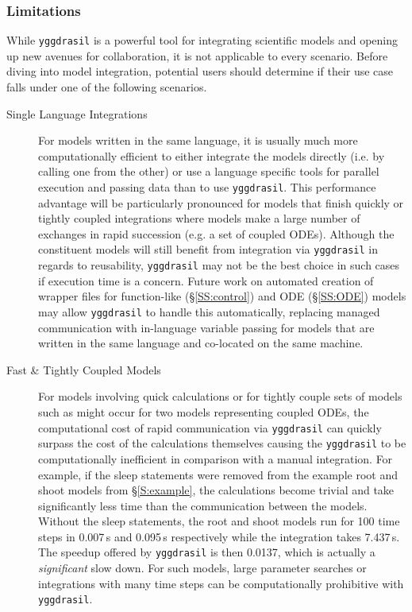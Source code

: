 \documentclass[journal]{IEEEtran}
\newcommand{\pkg}{{\tt yggdrasil}{}}
\begin{document}
\subsubsection{Limitations}\label{SS:limitations}
%
While {\pkg} is a powerful tool for integrating scientific models and opening up new avenues for collaboration, it is not applicable to every scenario. Before diving into model integration, potential users should determine if their use case falls under one of the following scenarios.
%
\begin{description}
	\item[Single Language Integrations] For models written in the same language, it is usually much more computationally efficient to either integrate the models directly (i.e. by calling one from the other) or use a language specific tools for parallel execution and passing data \citep[e.g. Parsl in Python][]{babuji18} than to use {\pkg}. This performance advantage will be particularly pronounced for models that finish quickly or tightly coupled integrations where models make a large number of exchanges in rapid succession (e.g. a set of coupled ODEs). Although the constituent models will still benefit from integration via {\pkg} in regards to reusability, {\pkg} may not be the best choice in such cases if execution time is a concern. Future work on automated creation of wrapper files for function-like (\S\ref{SS:control}) and ODE (\S\ref{SS:ODE}) models may allow {\pkg} to handle this automatically, replacing managed communication with in-language variable passing for models that are written in the same language and co-located on the same machine.
	\item[Fast \& Tightly Coupled Models] For models involving quick calculations or for tightly couple sets of models such as might occur for two models representing coupled ODEs, the computational cost of rapid communication via {\pkg} can quickly surpass the cost of the calculations themselves causing the {\pkg} to be computationally inefficient in comparison with a manual integration. For example, if the sleep statements were removed from the example root and shoot models from \S\ref{S:example}, the calculations become trivial and take significantly less time than the communication between the models. Without the sleep statements, the root and shoot models run for 100 time steps in 0.007\,s and 0.095\,s respectively while the integration takes 7.437\,s. The speedup offered by {\pkg} is then 0.0137, which is actually a \emph{significant} slow down. For such models, large parameter searches or integrations with many time steps can be computationally prohibitive with {\pkg}.

\end{description}
\end{document}
